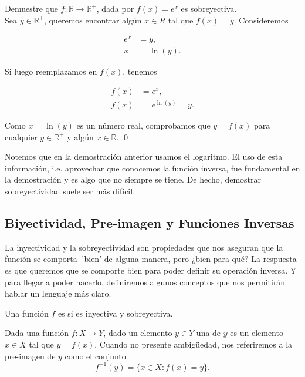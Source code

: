\documentclass[12pt]{book}
\begin{document}
\begin{exampleenv}
Demuestre que $f:\mathbb{R}\rightarrow \mathbb{R}^+$, dada por $f(x)=e^x$ es sobreyectiva.\\

Sea $y\in \mathbb{R}^+$, queremos encontrar algún $x\in R$ tal que $f(x)=y$. Consideremos

\begin{align*}
    e^x&=y,\\
    x&=\ln(y).
\end{align*}

Si luego reemplazamos en $f(x)$, tenemos

\begin{align*}
    f(x)&=e^x,\\
    f(x)&=e^{\ln(y)}=y.
\end{align*}


Como $x=\ln(y)$ es un número real, comprobamos que $y=f(x)$ para cualquier $y\in \mathbb{R}^+$ y algún $x\in \mathbb{R}$. \qed
\end{exampleenv}
Notemos que en la demostración anterior usamos el logaritmo. El uso de esta información, i.e. aprovechar que conocemos la función inversa, fue fundamental en la demostración y es algo que no siempre se tiene. De hecho, demostrar sobreyectividad suele ser más difícil.

\subsection{Biyectividad, Pre-imagen y Funciones Inversas}
\noindent
La inyectividad y la sobreyectividad son propiedades que nos aseguran que la función se comporta ´bien' de alguna manera, pero ¿bien para qué? La respuesta es que queremos que se comporte bien para poder definir su operación inversa. Y para llegar a poder hacerlo, definiremos algunos conceptos que nos permitirán hablar un lenguaje más claro.

\begin{definitionenv}
     Una función $f$ es  si es inyectiva y sobreyectiva.
\end{definitionenv}



\begin{definitionenv}
     Dada una función $f:X\rightarrow Y$, dado un elemento $y\in Y$ una  de $y$ es un elemento $x\in X$ tal que $y=f(x)$. Cuando no presente ambigüedad, nos referiremos a la pre-imagen de $y$ como el conjunto 
        $$ f^{-1}(y) = \{x \in X: f(x)=y\}.$$
\end{definitionenv}
\end{document}
